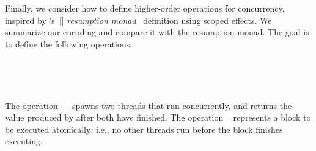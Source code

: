 Finally, we consider how to define higher-order operations for concurrency, inspired by \citeauthor{YangPWBS22}'s~[\citeyear{YangPWBS22}] \emph{resumption monad}~\cite{Claessen99,Schmidt1986denotational,PirogG14} definition using scoped effects.
We summarize our encoding and compare it with the resumption monad. The goal is to define the following operations:
%
%
\begin{code}[hide]%
\>[0][@{}l@{\AgdaIndent{1}}]%
\>[2]\AgdaSpace{}%
\AgdaModule{\AgdaUnderscore{}}\AgdaSpace{}%
\AgdaSpace{}%
\AgdaSpace{}%
\AgdaSymbol{:}\AgdaSpace{}%
\AgdaSpace{}%
\AgdaSpace{}%
\<%
\\
\>[2][@{}l@{\AgdaIndent{0}}]%
\>[4]\<%
\end{code}
\begin{code}%
\>[4][@{}l@{\AgdaIndent{1}}]%
\>[6]%
\>[16]\AgdaSymbol{:}\AgdaSpace{}%
\AgdaSymbol{\{}\AgdaSpace{}%
\AgdaSymbol{:}\AgdaSpace{}%
\AgdaSymbol{\}}\AgdaSpace{}%
\AgdaSpace{}%
\AgdaSymbol{(}\AgdaSpace{}%
\AgdaSpace{}%
\AgdaSymbol{:}\AgdaSpace{}%
\AgdaSpace{}%
\AgdaSpace{}%
\AgdaSpace{}%
\AgdaSpace{}%
\AgdaSymbol{)}%
\>[57]\AgdaSpace{}%
\AgdaSpace{}%
\AgdaSpace{}%
\AgdaSpace{}%
\AgdaSpace{}%
\<%
\\
%
\>[6]%
\>[16]\AgdaSymbol{:}\AgdaSpace{}%
\AgdaSymbol{\{}\AgdaSpace{}%
\AgdaSymbol{:}\AgdaSpace{}%
\AgdaSymbol{\}}\AgdaSpace{}%
\AgdaSpace{}%
\AgdaSpace{}%
\AgdaSpace{}%
\AgdaSpace{}%
\AgdaSpace{}%
%
\>[57]\AgdaSpace{}%
\AgdaSpace{}%
\AgdaSpace{}%
\AgdaSpace{}%
\AgdaSpace{}%
\<%
\end{code}
%
The operation ~~ spawns two threads that run concurrently, and returns the value produced by  after both have finished.
The operation ~ represents a block to be executed atomically; i.e., no other threads run before the block finishes executing.

